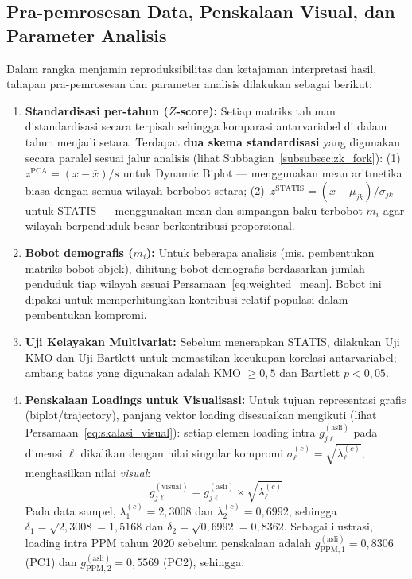 \subsection{\normalsize Pra-pemrosesan Data, Penskalaan Visual, dan Parameter Analisis}
Dalam rangka menjamin reproduksibilitas dan ketajaman interpretasi hasil, tahapan pra-pemrosesan dan parameter analisis dilakukan sebagai berikut:
\begin{enumerate}
    \item \textbf{Standardisasi per-tahun ($Z$-score):} Setiap matriks tahunan distandardisasi secara terpisah sehingga komparasi antarvariabel di dalam tahun menjadi setara. Terdapat \textbf{dua skema standardisasi} yang digunakan secara paralel sesuai jalur analisis (lihat Subbagian~\ref{subsubsec:zk_fork}): (1)~$z^{\mathrm{PCA}}=(x-\bar{x})/s$ untuk Dynamic Biplot --- menggunakan mean aritmetika biasa dengan semua wilayah berbobot setara; (2)~$z^{\mathrm{STATIS}}=(x-\mu_{jk})/\sigma_{jk}$ untuk STATIS --- menggunakan mean dan simpangan baku terbobot $m_i$ agar wilayah berpenduduk besar berkontribusi proporsional.
    \item \textbf{Bobot demografis ($m_i$):} Untuk beberapa analisis (mis. pembentukan matriks bobot objek), dihitung bobot demografis berdasarkan jumlah penduduk tiap wilayah sesuai Persamaan~\ref{eq:weighted_mean}. Bobot ini dipakai untuk memperhitungkan kontribusi relatif populasi dalam pembentukan kompromi.
    \item \textbf{Uji Kelayakan Multivariat:} Sebelum menerapkan STATIS, dilakukan Uji KMO dan Uji Bartlett untuk memastikan kecukupan korelasi antarvariabel; ambang batas yang digunakan adalah KMO $\geq 0{,}5$ dan Bartlett $p<0{,}05$.
    \item \textbf{Penskalaan Loadings untuk Visualisasi:} Untuk tujuan representasi grafis (biplot/trajectory), panjang vektor loading disesuaikan mengikuti \citet{abdi2012} (lihat Persamaan~\ref{eq:skalasi_visual}): setiap elemen loading intra $g_{j\ell}^{(\text{asli})}$ pada dimensi $\ell$ dikalikan dengan nilai singular kompromi $\sigma_{\ell}^{(c)} = \sqrt{\lambda_{\ell}^{(c)}}$, menghasilkan nilai \textit{visual}:
    \begin{equation}
        g_{j\ell}^{(\text{visual})} = g_{j\ell}^{(\text{asli})} \times \sqrt{\lambda_{\ell}^{(c)}}
        \label{eq:loading_visual_scale}
    \end{equation}
    Pada data sampel, $\lambda_1^{(c)} = 2{,}3008$ dan $\lambda_2^{(c)} = 0{,}6992$, sehingga $\delta_1 = \sqrt{2{,}3008} = 1{,}5168$ dan $\delta_2 = \sqrt{0{,}6992} = 0{,}8362$. Sebagai ilustrasi, loading intra PPM tahun 2020 sebelum penskalaan adalah $g_{\text{PPM},1}^{(\text{asli})} = 0{,}8306$ (PC1) dan $g_{\text{PPM},2}^{(\text{asli})} = 0{,}5569$ (PC2), sehingga:

\end{enumerate}
